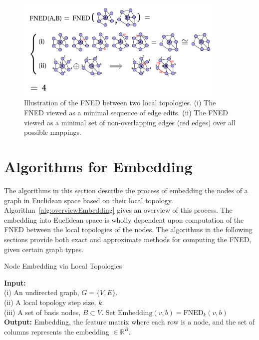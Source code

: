 \documentclass{article}
\begin{document}
\begin{figure}[h!tbp]
  \centering               
  \includegraphics[width=0.9\textwidth]{fig/fig2.pdf}
  \caption{Illustration of the FNED between two local topologies. (i) The FNED viewed as a minimal sequence of edge edits. (ii) The FNED viewed as a minimal set of non-overlapping edges (red edges) over all possible mappings.}
  \label{fig:fnedFigure}
\end{figure}


\section{Algorithms for Embedding}
\label{sec:algos}
The algorithms in this section describe the process of embedding the nodes of a graph in Euclidean space based on their local topology. Algorithm~\ref{alg:overviewEmbedding} gives an overview of this process. The embedding into Euclidean space is wholly dependent upon computation of the FNED between the local topologies of the nodes. The algorithms in the following sections provide both exact and approximate methods for computing the FNED, given certain graph types.

\begin{algorithm}[h!tbp]
\caption{Node Embedding via Local Topologies}
\label{alg:overviewEmbedding}
\begin{algorithmic}[1]
\STATE \textbf{Input:} \\(i) An undirected graph, $G = \{V,E\}$.\\(ii) A local topology step size, $k$.\\(iii) A set of basis nodes, $B \subset V$.
\STATE Set $\text{Embedding}(v,b) = \text{FNED}_{k}(v,b)$
\ENDFOR
\ENDFOR
\STATE \textbf{Output:} Embedding, the feature matrix where each row is a node, and the set of columns represents the embedding $\in \mathbb{R}^{B}$.
\end{algorithmic}
\end{algorithm}
\end{document}
